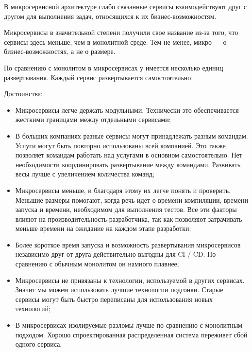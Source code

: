 В микросервисной архитектуре слабо связанные сервисы взаимодействуют друг с другом для выполнения задач, относящихся к их бизнес-возможностям.

Микросервисы в значительной степени получили свое название из-за того, что сервисы здесь меньше, чем в монолитной среде. Тем не менее, микро — о бизнес-возможностях, а не о размере.

По сравнению с монолитом в микросервисах у имеется несколько единиц развертывания. Каждый сервис развертывается самостоятельно.

Достоинства:
\begin{itemize}
    \item Микросервисы легче держать модульными. Технически это обеспечивается жесткими границами между отдельными сервисами;
    \item В больших компаниях разные сервисы могут принадлежать разным командам.
    Услуги могут быть повторно использованы всей компанией.
    Это также позволяет командам работать над услугами в основном самостоятельно.
    Нет необходимости координировать развертывание между командами.
    Развивать весы лучше с увеличением количества команд;
    \item Микросервисы меньше, и благодаря этому их легче понять и проверить.
    Меньшие размеры помогают, когда речь идет о времени компиляции, времени запуска и времени, необходимом для выполнения тестов.
    Все эти факторы влияют на производительность разработчика, так как позволяют затрачивать меньше времени на ожидание на каждом этапе разработки;
    \item Более короткое время запуска и возможность развертывания микросервисов независимо друг от друга действительно выгодны для CI / CD.
    По сравнению с обычным монолитом он намного плавнее;
    \item Микросервисы не привязаны к технологии, используемой в других сервисах.
    Значит мы можем использовать лучшие технологии подгонки.
    Старые сервисы могут быть быстро переписаны для использования новых технологий;
    \item В микросервисах изолируемые разломы лучше по сравнению с монолитным подходом.
    Хорошо спроектированная распределенная система переживет сбой одного сервиса.
\end{itemize}

